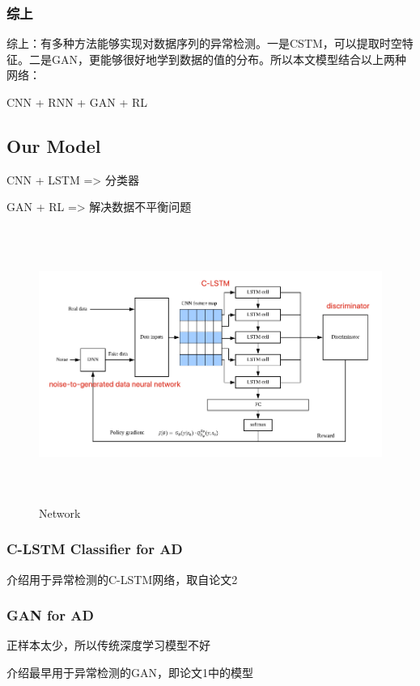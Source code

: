 \documentclass[12pt]{article}
\begin{document}
\subsubsection{综上}
综上：有多种方法能够实现对数据序列的异常检测。一是CSTM，可以提取时空特征。二是GAN，更能够很好地学到数据的值的分布。所以本文模型结合以上两种网络：

CNN + RNN + GAN + RL

\subsection{\textbf{Our Model}}
CNN + LSTM => 分类器

GAN + RL => 解决数据不平衡问题

\begin{figure}[htbp]

\centering

\includegraphics[height=9cm,width=14.25cm]{network.jpg}

\caption{Network}

\end{figure}

\subsubsection{C-LSTM Classifier for AD}
介绍用于异常检测的C-LSTM网络，取自论文2

\subsubsection{GAN for AD}
正样本太少，所以传统深度学习模型不好

介绍最早用于异常检测的GAN，即论文1中的模型
\end{document}
